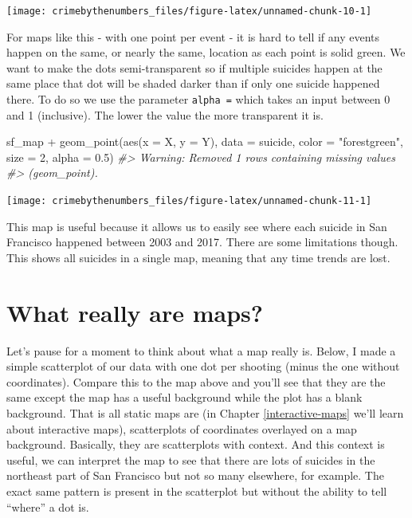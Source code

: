 \documentclass[
  12pt,
  openany]{book}
\newenvironment{Shaded}{\begin{snugshade}}{\end{snugshade}}
\newcommand{\AttributeTok}[1]{\textcolor[rgb]{0.61,0.61,0.61}{#1}}
\newcommand{\CommentTok}[1]{\textcolor[rgb]{0.37,0.37,0.37}{\textit{#1}}}
\newcommand{\DecValTok}[1]{\textcolor[rgb]{0.06,0.06,0.06}{#1}}
\newcommand{\FloatTok}[1]{\textcolor[rgb]{0.06,0.06,0.06}{#1}}
\newcommand{\FunctionTok}[1]{\textcolor[rgb]{0,0,0}{#1}}
\newcommand{\NormalTok}[1]{#1}
\newcommand{\SpecialCharTok}[1]{\textcolor[rgb]{0,0,0}{#1}}
\newcommand{\StringTok}[1]{\textcolor[rgb]{0.5,0.5,0.5}{#1}}
\begin{document}
\begin{center}\texttt{[image: crimebythenumbers\_files/figure-latex/unnamed-chunk-10-1]} \end{center}

For maps like this - with one point per event - it is hard to tell if any events happen on the same, or nearly the same, location as each point is solid green. We want to make the dots semi-transparent so if multiple suicides happen at the same place that dot will be shaded darker than if only one suicide happened there. To do so we use the parameter \texttt{alpha\ =} which takes an input between 0 and 1 (inclusive). The lower the value the more transparent it is.

\begin{Shaded}
\begin{Highlighting}[]
\NormalTok{sf\_map }\SpecialCharTok{+}
  \FunctionTok{geom\_point}\NormalTok{(}\FunctionTok{aes}\NormalTok{(}\AttributeTok{x =}\NormalTok{ X, }\AttributeTok{y =}\NormalTok{ Y),}
             \AttributeTok{data  =}\NormalTok{ suicide,}
             \AttributeTok{color =} \StringTok{"forestgreen"}\NormalTok{,}
             \AttributeTok{size  =} \DecValTok{2}\NormalTok{,}
             \AttributeTok{alpha =} \FloatTok{0.5}\NormalTok{)}
\CommentTok{\#\textgreater{} Warning: Removed 1 rows containing missing values}
\CommentTok{\#\textgreater{} (geom\_point).}
\end{Highlighting}
\end{Shaded}

\begin{center}\texttt{[image: crimebythenumbers\_files/figure-latex/unnamed-chunk-11-1]} \end{center}

This map is useful because it allows us to easily see where each suicide in San Francisco happened between 2003 and 2017. There are some limitations though. This shows all suicides in a single map, meaning that any time trends are lost.

\hypertarget{what-really-are-maps}{%
\section{What really are maps?}\label{what-really-are-maps}}

Let's pause for a moment to think about what a map really is. Below, I made a simple scatterplot of our data with one dot per shooting (minus the one without coordinates). Compare this to the map above and you'll see that they are the same except the map has a useful background while the plot has a blank background. That is all static maps are (in Chapter \ref{interactive-maps} we'll learn about interactive maps), scatterplots of coordinates overlayed on a map background. Basically, they are scatterplots with context. And this context is useful, we can interpret the map to see that there are lots of suicides in the northeast part of San Francisco but not so many elsewhere, for example. The exact same pattern is present in the scatterplot but without the ability to tell ``where'' a dot is.
\end{document}
